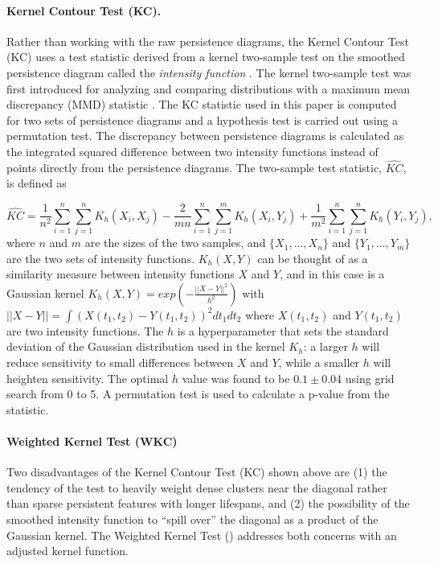 \documentclass[12pt]{article}
\begin{document}
\paragraph{Kernel Contour Test (KC).}
Rather than working with the raw persistence diagrams, the Kernel Contour Test (KC) uses a test statistic derived from a kernel two-sample test on the smoothed persistence diagram called the \emph{intensity function} \cite{chen2015statistical}. The kernel two-sample test was first introduced for analyzing and comparing distributions with a maximum mean discrepancy (MMD) statistic \cite{gretton2012kernel}. The KC statistic used in this paper is computed for two sets of persistence diagrams and a hypothesis test is carried out using a permutation test.  The discrepancy between persistence diagrams is calculated as the integrated squared difference between two intensity functions instead of points directly from the persistence diagrams. The two-sample test statistic, $\widehat{KC}$, is defined as
\begin{sloppypar}
\begin{equation*}
\widehat{KC} = \frac{1}{n^{2}}\sum_{i=1}^{n}\sum_{j=1}^{n} K_{h}(X_{i}, X_{j}) - \frac{2}{mn}\sum_{i=1}^{n}\sum_{j=1}^{m}K_{h}(X_{i}, Y_{j}) + \frac{1}{m^{2}}\sum_{i=1}^{n}\sum_{j=1}^{n} K_{h}(Y_{i}, Y_{j}),
\end{equation*}
where $n$ and $m$ are the sizes of the two samples, and $\{X_1, \ldots, X_n\}$ and $\{Y_1, \ldots, Y_m\}$ are the two sets of intensity functions.  $K_{h}(X,Y)$ can be thought of as a similarity measure between intensity functions $X$ and $Y$, and in this case is a Gaussian kernel $K_{h}(X,Y) = exp(-\frac{||X - Y||^{2}}{h^{2}})$ with  $||X - Y|| = \int \left(X(t_1, t_2) - Y(t_1, t_2)\right)^2dt_1dt_2$  where $X(t_1, t_2)$ and $Y(t_1, t_2)$ are two intensity functions. The $h$ is a hyperparameter that sets the standard deviation of the Gaussian distribution used in the kernel $K_{h}$: a larger $h$ will reduce sensitivity to small differences between $X$ and $Y$, while a smaller $h$ will heighten sensitivity. The optimal $h$ value was found to be $0.1 \pm 0.04$ using grid search from 0 to 5. A permutation test is used to calculate a p-value from the statistic.
\end{sloppypar}

\paragraph{Weighted Kernel Test (WKC)}
Two disadvantages of the Kernel Contour Test (KC) shown above are (1) the tendency of the test to heavily weight dense clusters near the diagonal rather than sparse persistent features with longer lifespans, and (2) the possibility of the smoothed intensity function to ``spill over'' the diagonal as a product of the Gaussian kernel. The Weighted Kernel Test (\cite{chen2015statistical}) addresses both concerns with an adjusted kernel function. 
\end{document}

